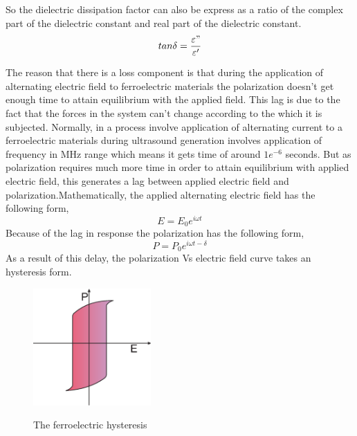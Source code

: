 So the dielectric dissipation factor can also be express as a ratio of the complex part of the dielectric constant and real part of the dielectric constant.
\begin{equation}\label{Eq:tandeltacurrentloss}
    tan\delta =\frac{\varepsilon"}{\varepsilon'}
\end{equation} 

The reason that there is a loss component is that during the application of alternating electric field to ferroelectric materials the polarization doesn't get enough time to attain equilibrium with the applied field. This lag is due to the fact that the  forces in the system can't change according to the which it is subjected. Normally, in a process involve application of alternating current to a ferroelectric materials during ultrasound generation involves application of frequency in  MHz range which means it gets time of around $1e^{-6}$ seconds. But as polarization requires much more time in order to attain equilibrium with applied electric field, this generates a lag between applied electric field and polarization.Mathematically, the applied alternating electric field has the following form,
\begin{equation}\label{Eq:Elelctricfield}
    E =E_{0}e^{i\omega t}
\end{equation}
Because of the lag in response the polarization has the following form,
  \begin{equation}\label{Eq:Polarization}
    P =P_{0}e^{i\omega t-\delta}
\end{equation}
As a result of this delay, the polarization Vs electric field curve takes an hysteresis form. 

\begin{figure}[t]
\centering
	\includegraphics[width=0.4\textwidth]{Hysteresis.eps}\\
	\caption[The ferroelectric hysteresis]{The ferroelectric hysteresis}\label{fig:The ferroelectric hysteresis}
\end{figure}